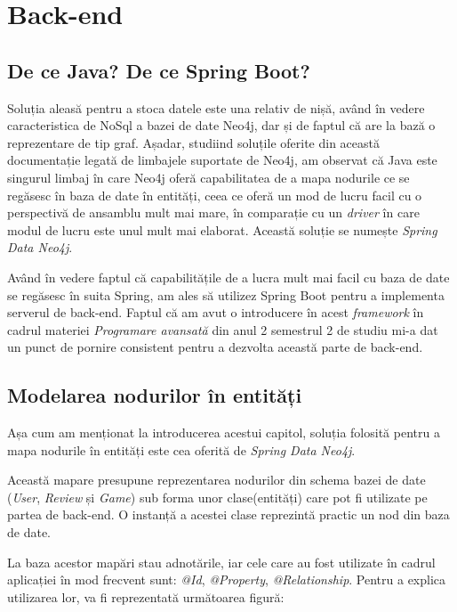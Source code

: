 \documentclass[12pt,a4paper]{report}
\begin{document}
\section{Back-end}

\subsection{De ce Java? De ce Spring Boot?}

Soluția aleasă pentru a stoca datele este una relativ de nișă, având în vedere caracteristica de NoSql a bazei de date Neo4j, dar și de faptul că are la bază o reprezentare de tip graf. Așadar, studiind soluțile oferite din această documentație \cite{20} legată de limbajele suportate de Neo4j, am observat că Java este singurul limbaj în care Neo4j oferă capabilitatea de a mapa nodurile ce se regăsesc în baza de date în entități, ceea ce oferă un mod de lucru facil cu o perspectivă de ansamblu mult mai mare, în comparație cu un \emph{driver} în care modul de lucru este unul mult mai elaborat. Această soluție se numește \emph{Spring Data Neo4j}. \cite{21}

Având în vedere faptul că capabilitățile de a lucra mult mai facil cu baza de date se regăsesc în suita Spring, am ales să utilizez Spring Boot pentru a implementa serverul de back-end. Faptul că am avut o introducere în acest \emph{framework} în cadrul materiei \emph{Programare avansată} din anul 2 semestrul 2 de studiu mi-a dat un punct de pornire consistent pentru a dezvolta această parte de back-end.


\subsection{Modelarea nodurilor în entități}

Așa cum am menționat la introducerea acestui capitol, soluția folosită pentru a mapa nodurile în entități este cea oferită de \emph{Spring Data Neo4j}.

Această mapare presupune reprezentarea nodurilor din schema bazei de date (\emph{User}, \emph{Review} și \emph{Game}) sub forma unor clase(entități) care pot fi utilizate pe partea de back-end. O instanță a acestei clase reprezintă practic un nod din baza de date.

La baza acestor mapări stau adnotările, iar cele care au fost utilizate în cadrul aplicației în mod frecvent sunt: \emph{@Id}, \emph{@Property}, \emph{@Relationship}. Pentru a explica utilizarea lor, va fi reprezentată următoarea figură:
\end{document}
